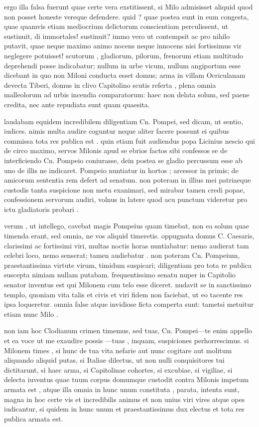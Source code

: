  ergo illa falsa fuerunt quae certe vera exstitissent, si Milo admisisset aliquid quod non posset honeste vereque defendere. quid ? quae postea sunt in eum congesta, quae quamvis etiam mediocrium delictorum conscientiam perculissent, ut sustinuit, di immortales! sustinuit? immo vero ut contempsit ac pro nihilo putavit, quae neque maximo animo nocens neque innocens nisi fortissimus vir neglegere potuisset! scutorum , gladiorum, pilorum, frenorum etiam multitudo deprehendi posse indicabatur; nullum in urbe vicum, nullum angiportum esse dicebant in quo non Miloni conducta esset domus; arma in villam Ocriculanam devecta Tiberi, domus in clivo Capitolino scutis referta , plena omnia malleolorum ad urbis incendia comparatorum: haec non delata solum, sed paene credita, nec ante repudiata sunt quam quaesita.

 laudabam equidem incredibilem diligentiam Cn. Pompei, sed dicam, ut sentio, iudices. nimis multa audire coguntur neque aliter facere possunt ei quibus commissa tota res publica est . quin etiam fuit audiendus popa Licinius nescio qui de circo maximo, servos Milonis apud se ebrios factos sibi confessos se de interficiendo Cn. Pompeio coniurasse, dein postea se gladio percussum esse ab uno de illis ne indicaret. Pompeio nuntiatur in hortos ; arcessor in primis; de amicorum sententia rem defert ad senatum. non poteram in illius mei patriaeque custodis tanta suspicione non metu exanimari, sed mirabar tamen credi popae, confessionem servorum audiri, volnus in latere quod acu punctum videretur pro ictu gladiatoris probari .

 verum , ut intellego, cavebat magis Pompeius quam timebat, non ea solum quae timenda erant, sed omnia, ne vos aliquid timeretis. oppugnata domus C. Caesaris, clarissimi ac fortissimi viri, multas noctis horas nuntiabatur: nemo audierat tam celebri loco, nemo senserat; tamen audiebatur . non poteram Cn. Pompeium, praestantissima virtute virum, timidum suspicari; diligentiam pro tota re publica suscepta nimiam nullam putabam. frequentissimo senatu nuper in Capitolio senator inventus est qui Milonem cum telo esse diceret. nudavit se in sanctissimo templo, quoniam vita talis et civis et viri fidem non faciebat, ut eo tacente res ipsa loqueretur. omnia false atque invidiose ficta comperta sunt: tametsi metuitur etiam nunc Milo .

 non iam hoc Clodianum crimen timemus, sed tuas, Cn. Pompei—te enim appello et ea voce ut me exaudire possis —tuas , inquam, suspiciones perhorrescimus. si Milonem times , si hunc de tua vita nefarie aut nunc cogitare aut molitum aliquando aliquid putas, si Italiae dilectus, ut non nulli conquisitores tui dictitarunt, si haec arma, si Capitolinae cohortes, si excubiae, si vigiliae, si delecta iuventus quae tuum corpus domumque custodit contra Milonis impetum armata est , atque illa omnia in hunc unum constituta , parata, intenta sunt, magna in hoc certe vis et incredibilis animus et non unius viri vires atque opes iudicantur, si quidem in hunc unum et praestantissimus dux electus et tota res publica armata est.

